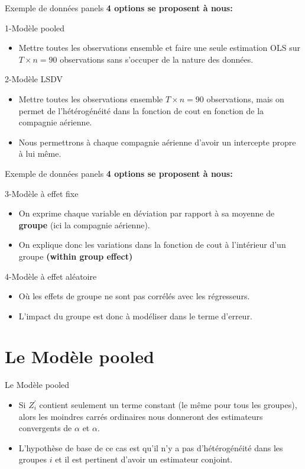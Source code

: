 \documentclass{beamer}
\begin{document}
\begin{frame}{Exemple de données panels}
\textbf{4 options se proposent à nous:}
\begin{block}{1-Modèle pooled}
\begin{itemize}
\item Mettre toutes les observations ensemble et faire une seule estimation OLS sur $T \times n=90$ observations sans s’occuper de la nature des données.
\end{itemize}
\end{block}
\begin{block}{2-Modèle LSDV}
\begin{itemize}
\item Mettre toutes les observations ensemble $T \times n=90$ observations, mais on permet de l’hétérogénéité dans la fonction de cout en fonction de la compagnie aérienne. 
\item Nous permettrons à chaque compagnie aérienne d’avoir un intercepte propre à lui même.
\end{itemize}
\end{block}
\end{frame}


\begin{frame}{Exemple de données panels}
\textbf{4 options se proposent à nous:}
\begin{block}{3-Modèle à effet fixe}
\begin{itemize}
\item On exprime chaque variable en déviation par rapport à sa moyenne de \textbf{groupe} (ici la compagnie aérienne).
\item On explique donc les variations
dans la fonction de cout à l’intérieur d’un groupe \textbf{(within group effect)}
\end{itemize}
\end{block}
\begin{block}{4-Modèle à effet aléatoire}
\begin{itemize}
\item Où les effets de groupe ne sont pas corrélés avec les régresseurs.
\item L’impact du groupe est donc à modéliser dans le terme d’erreur.
\end{itemize}
\end{block}
\end{frame}


\section{Le Modèle pooled}
\frame{\tableofcontents[current]}
\begin{frame}{Le Modèle pooled}
\begin{itemize}
\item Si $Z_{i}^{'}$ contient seulement un terme constant (le même pour tous les groupes), alors les moindres carrés ordinaires nous donneront des estimateurs convergents de $\alpha$ et $\alpha$.
\item L’hypothèse de base de ce cas est qu’il n’y a pas d’hétérogénéité dans les groupes $i$ et il est pertinent d’avoir un estimateur conjoint.
\end{itemize}
\end{frame}
\end{document}
